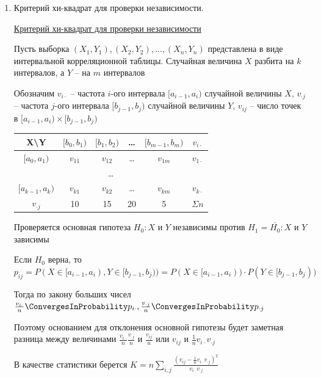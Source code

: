 \begin{enumerate}
    \item Критерий хи-квадрат для проверки независимости.

    \hyperlink{chi_square_independence_criterion}{Критерий хи-квадрат для проверки независимости}
    
    Пусть выборка $(X_1, Y_1), (X_2, Y_2), \dots, (X_n, Y_n)$ представлена в виде интервальной корреляционной таблицы. Случайная величина $X$ 
    разбита на $k$ интервалов, а $Y$ -- на $m$ интервалов

    Обозначим $v_{i\cdot}$ -- частота $i$-ого интервала $[a_{i - 1}, a_i)$ случайной величины $X$, 
    $v_{\cdot j}$ -- частота $j$-ого интервала $[b_{j - 1}, b_j)$ случайной величины $Y$, $v_{ij}$ -- число точек в $[a_{i - 1}, a_i) \times [b_{j - 1}, b_j)$


    \begin{tabular}{c|c|c|c|c|c}
        X\backslash Y & $[b_0, b_1)$ & $[b_1, b_2)$ & \dots & $[b_{m - 1}, b_m)$ & $v_{i\cdot}$ \\
        \hline
        $[a_0, a_1)$ & $v_{11}$ & $v_{12}$ & \dots & $v_{1m}$ & $v_{1\cdot}$ \\
        \hline
        \multicolumn{6}{c}{\dots} \\
        \hline
        $[a_{k - 1}, a_k)$ & $v_{k1}$ & $v_{k2}$ & \dots & $v_{km}$ & $v_{k\cdot}$ \\
        \hline
        $v_{\cdot j}$ & 10 & 15 & 20 & 5 & $\Sigma n$ \\
    \end{tabular}

    Проверяется основная гипотеза $H_0 : X \text{ и } Y$ независимы против $H_1 = \overline{H_0} : X \text{ и } Y$ зависимы

    Если $H_0$ верна, то $p_{ij} = P(X \in [a_{i - 1}, a_i), Y \in [b_{j - 1}, b_j)) = P(X \in [a_{i - 1}, a_i)) \cdot P(Y \in [b_{j - 1}, b_j))$

    Тогда по закону больших чисел $\frac{v_{i\cdot}}{n} \ConvergesInProbability p_{i\cdot}, \frac{v_{\cdot j}}{n} \ConvergesInProbability p_{\cdot j}$

    Поэтому основанием для отклонения основной гипотезы будет заметная разница между величинами $\frac{v_{i\cdot}}{n}\frac{v_{\cdot j}}{n}$ и 
    $\frac{v_{ij}}{n}$ или $v_{ij}$ и $\frac{1}{n} v_{i\cdot} v_{\cdot j}$

    В качестве статистики берется $K = n \sum_{i, j} \frac{\left(v_{ij} - \frac{1}{n} v_{i\cdot} v_{\cdot j}\right)^2}{v_{i\cdot} v_{\cdot j}}$


\end{enumerate}
